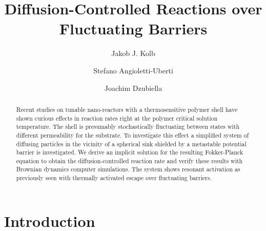\documentclass[twocolumn,superscriptaddress]{revtex4}
\begin{document}
 

\title{Diffusion-Controlled Reactions over Fluctuating Barriers} 

\author{Jakob J. Kolb}
\author{Stefano Angioletti-Uberti}
\author{Joachim Dzubiella}



\begin{abstract}
Recent studies on tunable nano-reactors with a thermosensitive polymer shell have shown curious effects in reaction rates
right at the polymer critical solution temperature.
The shell is presumably stochastically fluctuating between states with different permeability for the substrate.
To investigate this effect a simplified system of diffusing particles in the vicinity of a spherical sink shielded by a metastable potential barrier is investigated. We derive an implicit solution for the resulting Fokker-Planck equation to obtain the diffusion-controlled reaction rate and verify these results with Brownian dynamics computer simulations. The system shows resonant activation as previously seen with thermally activated escape over fluctuating barriers.


\end{abstract}

\maketitle

\section{Introduction}
\end{document}
